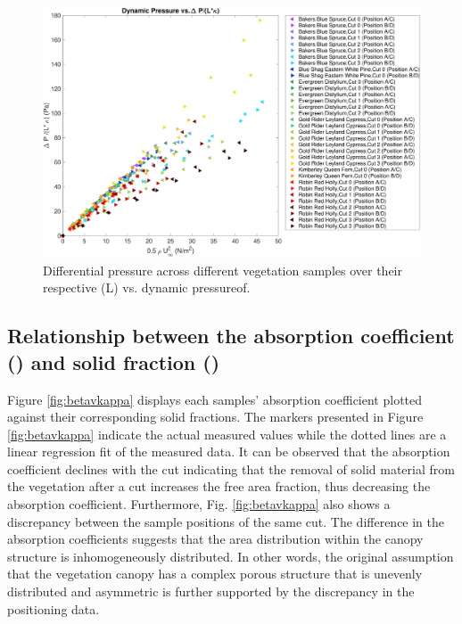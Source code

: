 \documentclass[12pt]{article}
\begin{document}
\begin{figure}[h]
	\centering 	\includegraphics[width=0.9\linewidth]{DPoveraf(Overall_Ave).pdf}
	\caption{Differential pressure across different vegetation samples over their respective (\textkappa L) vs. dynamic pressureof.}
	\label{fig:DPoveraf(Overall)}
\end{figure}

\subsection{Relationship between the absorption coefficient (\textkappa) and solid fraction (\textbeta) }

Figure \ref{fig:betavkappa} displays each samples' absorption coefficient plotted against their corresponding solid fractions. The markers presented in Figure \ref{fig:betavkappa} indicate the actual measured values while the dotted lines are a linear regression fit of the measured data. It can be observed that the absorption coefficient declines with the cut indicating that the removal of solid material from the vegetation after a cut increases the free area fraction, thus decreasing the absorption coefficient. Furthermore, Fig. \ref{fig:betavkappa} also shows a discrepancy between the sample positions of the same cut. The difference in the absorption coefficients suggests that the area distribution within the canopy structure is inhomogeneously distributed. In other words, the original assumption that the vegetation canopy has a complex porous structure that is unevenly distributed and asymmetric is further supported by the discrepancy in the positioning data.
\end{document}
